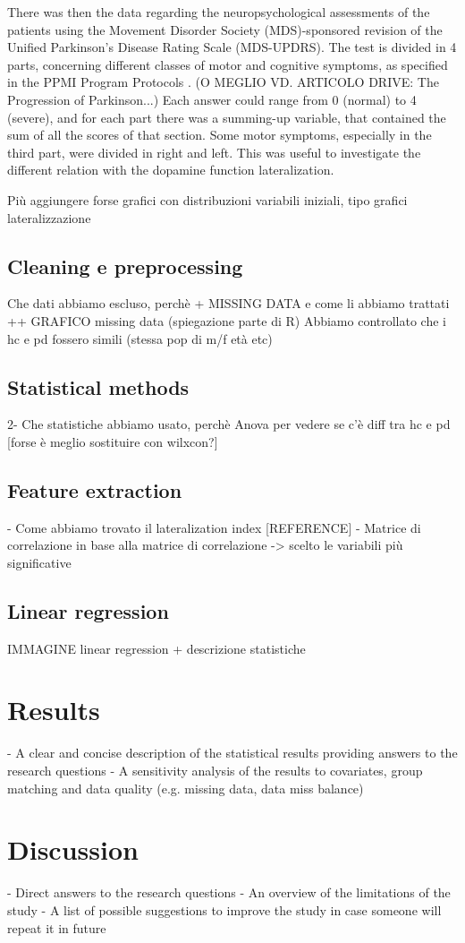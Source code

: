 \documentclass[]{article}
\begin{document}
\begin{multicols}{2}
There was then the data regarding the neuropsychological assessments of the patients using the Movement Disorder Society (MDS)-sponsored revision of the Unified Parkinson's Disease Rating Scale (MDS-UPDRS). The test is divided in 4 parts, concerning different classes of motor and cognitive symptoms, as specified in the PPMI Program Protocols . (O MEGLIO VD. ARTICOLO DRIVE: The Progression of Parkinson...) Each answer could range from 0 (normal) to 4 (severe), and for each part there was a summing-up variable, that contained the sum of all the scores of that section. Some motor symptoms, especially in the third part, were divided in right and left. This was useful to investigate the different relation with the dopamine function lateralization.
\newline

Più aggiungere forse grafici con distribuzioni variabili iniziali, tipo grafici lateralizzazione
\subsection{Cleaning e preprocessing}
Che dati abbiamo escluso, perchè + MISSING DATA  e come li abbiamo trattati
++ GRAFICO missing data (spiegazione parte di R)
Abbiamo controllato che i hc e pd fossero simili (stessa pop di m/f età etc)
\subsection{Statistical methods}
2- Che statistiche abbiamo usato, perchè
Anova per vedere se c'è diff tra hc e pd [forse è meglio sostituire con wilxcon?]
\subsection{Feature extraction}
- Come abbiamo trovato il lateralization index [REFERENCE]
- Matrice di correlazione
in base alla matrice di correlazione ->  scelto le variabili più significative
\subsection{Linear regression}
IMMAGINE linear regression + descrizione statistiche 

\section{Results}

- A clear and concise description of the statistical results 
providing answers to the research questions
\newline
- A sensitivity analysis of the results to covariates, group matching and data quality (e.g. missing data, data miss balance)

\section{Discussion}

- Direct answers to the research questions
\newline
- An overview of the limitations of the study
\newline
- A list of possible suggestions to improve the study in case 
someone will repeat it in future

\end{multicols}

\printbibliography
\end{document}
